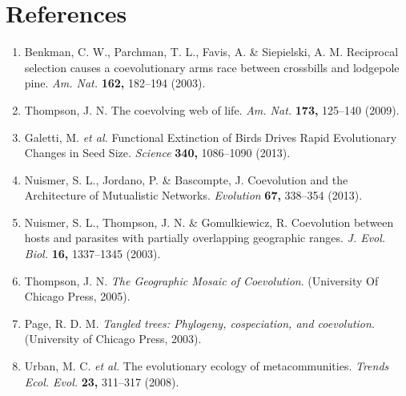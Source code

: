\documentclass{nature}
\begin{document}


\section*{References}

\begin{enumerate}

\item Benkman, C. W., Parchman, T. L., Favis, A. \& Siepielski, A.
M. Reciprocal selection causes a coevolutionary arms race
between crossbills and lodgepole pine. \emph{Am. Nat.} \textbf{162,}
182--194 (2003).

\item Thompson, J. N. The coevolving web of life. \emph{Am.
Nat.} \textbf{173,} 125--140 (2009).

\item Galetti, M. \emph{et al.} Functional Extinction of Birds Drives Rapid
Evolutionary Changes in Seed Size. \emph{Science} \textbf{340,}
1086--1090 (2013).

\item Nuismer, S. L., Jordano, P. \& Bascompte, J. Coevolution
and the Architecture of Mutualistic Networks. \emph{Evolution}
\textbf{67,} 338--354 (2013).

\item Nuismer, S. L., Thompson, J. N. \& Gomulkiewicz, R.
Coevolution between hosts and parasites with partially overlapping
geographic ranges. \emph{J. Evol. Biol.} \textbf{16,} 1337--1345 (2003).

\item Thompson, J. N. \emph{The Geographic Mosaic of
Coevolution}. (University Of Chicago Press, 2005).

\item Page, R. D. M. \emph{Tangled trees: Phylogeny,
cospeciation, and coevolution}. (University of Chicago Press, 2003).

\item Urban, M. C. \emph{et al.} The evolutionary ecology of
metacommunities. \emph{Trends Ecol. Evol.} \textbf{23,} 311--317 (2008).


\end{enumerate}
\end{document}
